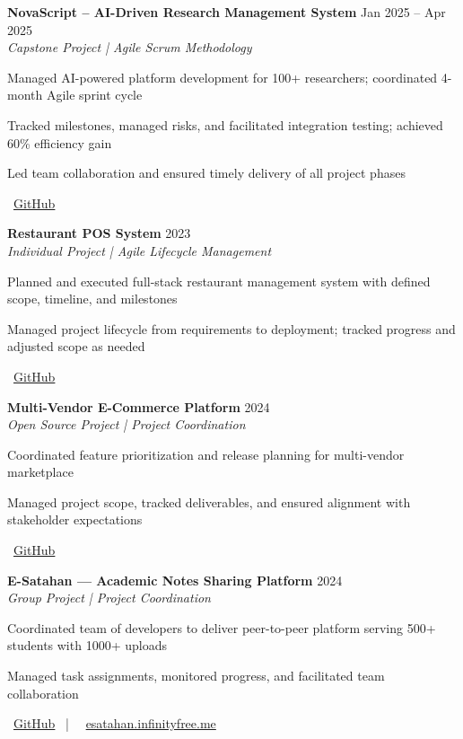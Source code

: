 \documentclass[letterpaper,10pt]{article}
\newenvironment{resume_list}{
  \vspace{-2pt}
  \begin{itemize}[itemsep=1pt, leftmargin=14pt]
}{
  \end{itemize}\vspace{-3pt}
}
\begin{document}
\textbf{NovaScript – AI-Driven Research Management System} \hfill Jan 2025 – Apr 2025\\
\textit{Capstone Project | Agile Scrum Methodology}\\
\begin{resume_list}
  \item Managed AI-powered platform development for 100+ researchers; coordinated 4-month Agile sprint cycle
  \item Tracked milestones, managed risks, and facilitated integration testing; achieved 60\% efficiency gain
  \item Led team collaboration and ensured timely delivery of all project phases
  \item \faGithub~\href{https://github.com/Chandima0406/NovaScript.git}{GitHub}
\end{resume_list}

\textbf{Restaurant POS System} \hfill 2023\\
\textit{Individual Project | Agile Lifecycle Management}\\
\begin{resume_list}
  \item Planned and executed full-stack restaurant management system with defined scope, timeline, and milestones
  \item Managed project lifecycle from requirements to deployment; tracked progress and adjusted scope as needed
  \item \faGithub~\href{https://github.com/vindyakodithuwakku02/pos-system.git}{GitHub}
\end{resume_list}

\textbf{Multi-Vendor E-Commerce Platform} \hfill 2024\\
\textit{Open Source Project | Project Coordination}\\
\begin{resume_list}
  \item Coordinated feature prioritization and release planning for multi-vendor marketplace
  \item Managed project scope, tracked deliverables, and ensured alignment with stakeholder expectations
  \item \faGithub~\href{https://github.com/vindyakodithuwakku02/gocart.git}{GitHub}
\end{resume_list}

\textbf{E-Satahan — Academic Notes Sharing Platform} \hfill 2024\\
\textit{Group Project | Project Coordination}\\
\begin{resume_list}
  \item Coordinated team of developers to deliver peer-to-peer platform serving 500+ students with 1000+ uploads
  \item Managed task assignments, monitored progress, and facilitated team collaboration
  \item \faGithub~\href{https://github.com/Chandima0406/E-Satahan.git}{GitHub} ~|~ \faGlobe~\href{https://esatahan.infinityfree.me}{esatahan.infinityfree.me}
\end{resume_list}
\end{document}
